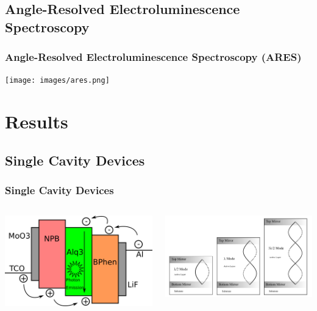 \documentclass{beamer}
\begin{document}
    \subsection{Angle-Resolved Electroluminescence Spectroscopy}
		\begin{frame}
			\frametitle{Angle-Resolved Electroluminescence Spectroscopy (ARES)}
			\centering
			\texttt{[image: images/ares.png]}
		\end{frame}
    
\section{Results}
    \frame{\tableofcontents[currentsection]}
    
    \subsection{Single Cavity Devices}
		\begin{frame}
			\frametitle{Single Cavity Devices}
			\begin{columns}
				\begin{column}{0.5\textwidth}
					\includegraphics[width=\textwidth]{images/green_oled_band_diagram.png}
				\end{column}
				\begin{column}{0.5\textwidth}
					\includegraphics[width=\textwidth]{images/mode_schematic.png}
				\end{column}
			\end{columns}
		\end{frame}
\end{document}
